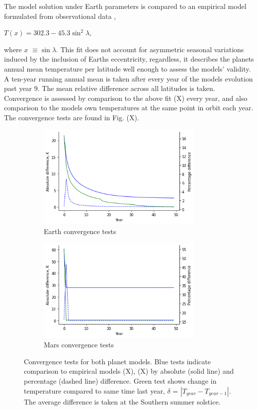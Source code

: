 \documentclass[12pt,onecolumn]{revtex4-2}    %
\begin{document}
The model solution under Earth parameters is compared to an empirical model formulated from observational data \cite{NC79},

\begin{center}
$T(x) = 302.3 - 45.3 \sin^{2}\lambda,$
\end{center}

where $x$ $\equiv \sin\lambda$. This fit does not account for asymmetric seasonal variations induced by the inclusion of Earths eccentricity, regardless, it describes the planets annual mean temperature per latitude well enough to assess the models' validity. A ten-year running annual mean is taken after every year of the models evolution past year 9. The mean relative difference across all latitudes is taken. Convergence is assessed by comparison to the above fit (X) every year, and also comparison to the models own temperatures at the same point in orbit each year. The convergence tests are found in Fig. (X).

\begin{figure}[t]
\begin{subfigure}{.5\textwidth}
  \centering
  \includegraphics[width = 8cm]{Convergence.png}
  \caption{Earth convergence tests}
  \label{fig:sub1}
\end{subfigure}%
\begin{subfigure}{.5\textwidth}
  \centering
  \includegraphics[width=8cm]{MarsConvergence.png}
  \caption{Mars convergence tests}
  \label{fig:sub2}
\end{subfigure}
\raggedright
\caption{Convergence tests for both planet models. Blue tests indicate comparison to empirical models (X), (X) by absolute (solid line) and percentage (dashed line) difference. Green test shows change in temperature compared to same time last year, $\delta$ = $|T_{year} - T_{year-1}|$. The average difference is taken at the Southern summer solstice.}
\label{fig:test}
\end{figure}
\end{document}
